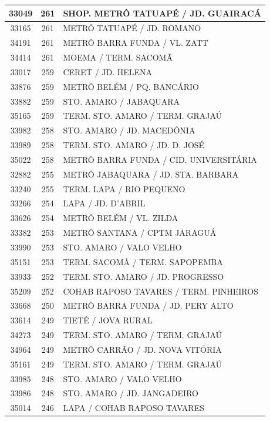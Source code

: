 \documentclass[
	12pt,				%
	oneside,			%
	a4paper,			%
	english,			%
	brazil				%
	]{abntex2ppgsi}
\begin{document}
{{\begin{apendicesenv}
\begin{longtable}{c|c|p{7cm}}
 \hline 
33049 &	261 &	SHOP. METRÔ TATUAPÉ / JD. GUAIRACÁ \\ 
 \hline 
33165 &	261 &	METRÔ TATUAPÉ / JD. ROMANO \\ 
 \hline 
34191 &	261 &	METRÔ BARRA FUNDA / VL. ZATT \\ 
 \hline 
34414 &	261 &	MOEMA / TERM. SACOMÃ \\ 
 \hline 
33017 &	259 &	CERET / JD. HELENA \\ 
 \hline 
33876 &	259 &	METRÔ BELÉM / PQ. BANCÁRIO \\ 
 \hline 
33882 &	259 &	STO. AMARO / JABAQUARA \\ 
 \hline 
35165 &	259 &	TERM. STO. AMARO / TERM. GRAJAÚ \\ 
 \hline 
33982 &	258 &	STO. AMARO / JD. MACEDÔNIA \\ 
 \hline 
33989 &	258 &	TERM. STO. AMARO / JD. D. JOSÉ \\ 
 \hline 
35022 &	258 &	METRÔ BARRA FUNDA / CID. UNIVERSITÁRIA \\ 
 \hline 
32882 &	255 &	METRÔ JABAQUARA / JD. STA. BARBARA \\ 
 \hline 
33240 &	255 &	TERM. LAPA / RIO PEQUENO \\ 
 \hline 
33266 &	254 &	LAPA / JD. D'ABRIL \\ 
 \hline 
33626 &	254 &	METRÔ BELÉM / VL. ZILDA \\ 
 \hline 
33382 &	253 &	METRÔ SANTANA / CPTM JARAGUÁ \\ 
 \hline 
33990 &	253 &	STO. AMARO / VALO VELHO \\ 
 \hline 
35151 &	253 &	TERM. SACOMÃ / TERM. SAPOPEMBA \\ 
 \hline 
33933 &	252 &	TERM. STO. AMARO / JD. PROGRESSO \\ 
 \hline 
35209 &	252 &	COHAB RAPOSO TAVARES / TERM. PINHEIROS \\ 
 \hline 
33668 &	250 &	METRÔ BARRA FUNDA / JD. PERY ALTO \\ 
 \hline 
33614 &	249 &	TIETÊ / JOVA RURAL \\ 
 \hline 
34273 &	249 &	TERM. STO. AMARO / TERM. GRAJAÚ \\ 
 \hline 
34964 &	249 &	METRÔ CARRÃO / JD. NOVA VITÓRIA \\ 
 \hline 
35161 &	249 &	TERM. STO. AMARO / TERM. GRAJAÚ \\ 
 \hline 
33985 &	248 &	STO. AMARO / VALO VELHO \\ 
 \hline 
33986 &	248 &	STO. AMARO / JD. JANGADEIRO \\ 
 \hline 
35014 &	246 &	LAPA / COHAB RAPOSO TAVARES \\ 

\end{longtable}
\end{apendicesenv}}}
\end{document}
